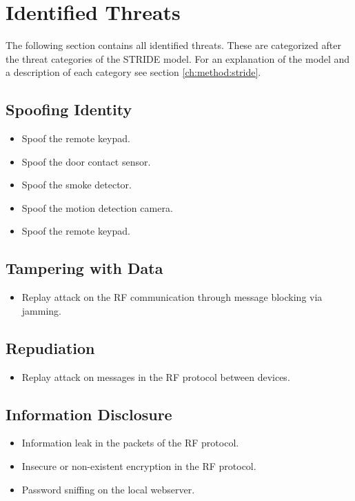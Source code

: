 \section{Identified Threats} \label{ch:threat-model:threats}
The following section contains all identified threats. These are categorized after the threat categories of the STRIDE model. For an explanation of the model and a description of each category see section \ref{ch:method:stride}.

\subsection{Spoofing Identity}
\begin{itemize}
    \item Spoof the remote keypad.
    \item Spoof the door contact sensor.
    \item Spoof the smoke detector.
    \item Spoof the motion detection camera.
    \item Spoof the remote keypad.
\end{itemize}

\subsection{Tampering with Data}
\begin{itemize}
    \item Replay attack on the RF communication through message blocking via jamming.
\end{itemize}

\subsection{Repudiation}
\begin{itemize}
    \item Replay attack on messages in the RF protocol between devices.
\end{itemize}

\subsection{Information Disclosure}
\begin{itemize}
    \item Information leak in the packets of the \gls{RF} protocol.
    \item Insecure or non-existent encryption in the \gls{RF} protocol.
    \item Password sniffing on the local webserver.
\end{itemize}

